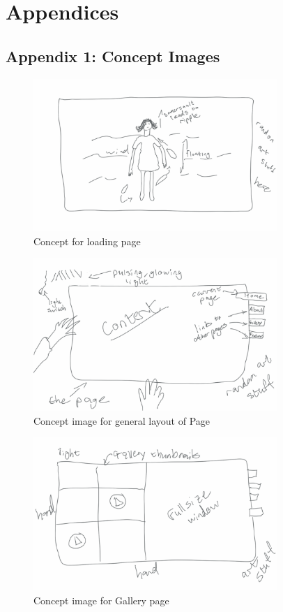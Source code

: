 \documentclass{article}
\begin{document}
\newpage
\section{Appendices}
\subsection{Appendix 1: Concept Images}
    \begin{figure}[h]
    \centering
    \caption{Concept for loading page}
    \includegraphics[width=350px]{Concept_Loading.png}
    \end{figure}
    \begin{figure}[h]
    \centering
    \caption{Concept image for general layout of Page}
    \includegraphics[width=350px]{Concept_Frame.png}
    \end{figure}
    \begin{figure}[h]
    \centering
    \caption{Concept image for Gallery page}
    \includegraphics[width=350px]{Concept_Gallery.png}
    \end{figure}
\newpage
\end{document}
